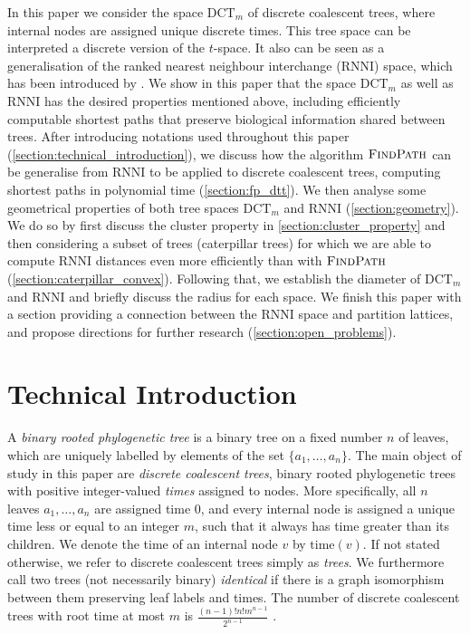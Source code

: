 \documentclass[11pt]{amsart}
\newcommand{\rnni}{\mathrm{RNNI}}
\newcommand{\findpath}{\textsc{FindPath}}
\newcommand{\ntime}{\mathrm{time}}
\newcommand{\dtt}{\mathrm{DCT}}
\newcommand{\summary}[1]{} %
\begin{document}
\summary{Structure of the paper.}
In this paper we consider the space $\dtt_m$ of discrete coalescent trees, where internal nodes are assigned unique discrete times.
This tree space can be interpreted a discrete version of the $t$-space.
It also can be seen as a generalisation of the ranked nearest neighbour interchange ($\rnni$) space, which has been introduced by \textcite{Collienne2020-iu}.
We show in this paper that the space $\dtt_m$ as well as $\rnni$ has the desired properties mentioned above, including efficiently computable shortest paths that preserve biological information shared between trees.
After introducing notations used throughout this paper (\autoref{section:technical_introduction}), we discuss how the algorithm $\findpath$ \autocite{Collienne2020-iu} can be generalise from $\rnni$ to be applied to discrete coalescent trees, computing shortest paths in polynomial time (\autoref{section:fp_dtt}).
We then analyse some geometrical properties of both tree spaces $\dtt_m$ and $\rnni$ (\autoref{section:geometry}).
We do so by first discuss the cluster property in \autoref{section:cluster_property} and then considering a subset of trees (caterpillar trees) for which we are able to compute $\rnni$ distances even more efficiently than with $\findpath$ (\autoref{section:caterpillar_convex}).
Following that, we establish the diameter of $\dtt_m$ and $\rnni$ and briefly discuss the radius for each space.
We finish this paper with a section providing a connection between the $\rnni$ space and partition lattices, and propose directions for further research (\autoref{section:open_problems}).


\section{Technical Introduction}
\label{section:technical_introduction}

\summary{Introducing discrete coalescent trees and ranked trees}
A \emph{binary rooted phylogenetic tree} is a binary tree on a fixed number $n$ of leaves, which are uniquely labelled by elements of the set $\{a_1, \ldots, a_n\}$.
The main object of study in this paper are \emph{discrete coalescent trees}, binary rooted phylogenetic trees with positive integer-valued \emph{times} assigned to nodes.
More specifically, all $n$ leaves $a_1, \ldots, a_n$ are assigned time $0$, and every internal node is assigned a unique time less or equal to an integer $m$, such that it always has time greater than its children.
We denote the time of an internal node $v$ by $\ntime(v)$.
If not stated otherwise, we refer to discrete coalescent trees simply as \emph{trees}.
We furthermore call two trees (not necessarily binary) \emph{identical} if there is a graph isomorphism between them preserving leaf labels and times.
The number of discrete coalescent trees with root time at most $m$ is $\frac{(n-1)!n!m^{n-1}}{2^{n-1}}$ \autocite{Gavryushkin2018-ol}.
\end{document}
